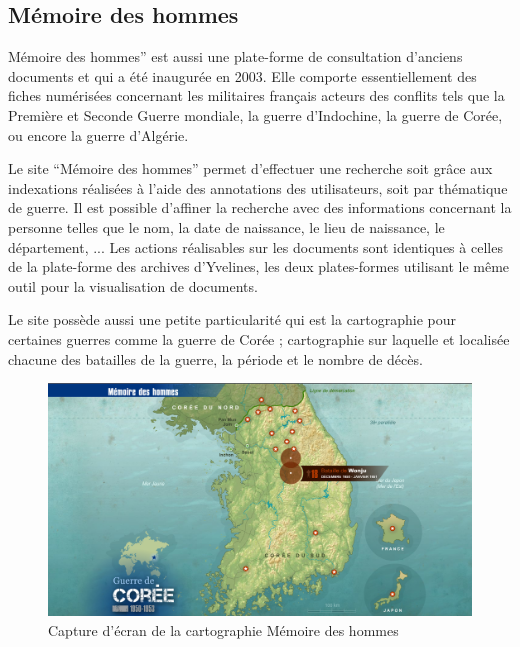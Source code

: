         \subsection{Mémoire des hommes}
        \label{subsec:memoire}
        Mémoire des hommes” est aussi une plate-forme de consultation d’anciens documents
        et qui a été inaugurée en 2003. Elle comporte essentiellement des fiches numérisées concernant
        les militaires français acteurs des conflits tels que la Première et Seconde Guerre mondiale,
        la guerre d’Indochine, la guerre de Corée, ou encore la guerre d’Algérie.

        Le site “Mémoire des hommes” permet d’effectuer une recherche soit grâce aux indexations réalisées
        à l’aide des annotations des utilisateurs, soit par thématique de guerre. Il est possible d’affiner
        la recherche avec des informations concernant la personne telles que le nom, la date de naissance,
        le lieu de naissance, le département, ... Les actions réalisables sur les documents sont identiques
        à celles de la plate-forme des archives d’Yvelines, les deux plates-formes utilisant le même outil
        pour la visualisation de documents.

        Le site possède aussi une petite particularité qui est la cartographie pour certaines guerres
        comme la guerre de Corée ; cartographie sur laquelle et localisée chacune des batailles de la guerre,
        la période et le nombre de décès.

        \begin{figure}[H]
            \centering
            \includegraphics[width=1\textwidth]{figure/screen_memoire_hommes.png}
            \caption{Capture d'écran de la cartographie Mémoire des hommes}
            \label{fig:memoire_hommes}
        \end{figure}


